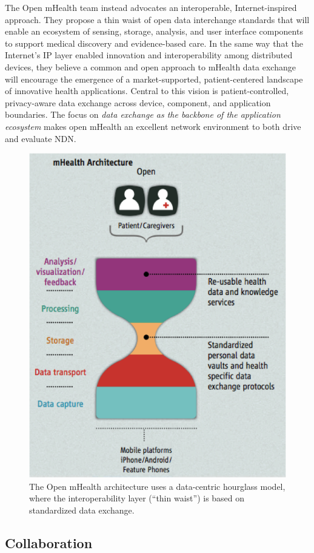 The Open mHealth team instead advocates an interoperable,  Internet-inspired
approach. They propose a thin waist of open data interchange standards
that will enable an ecosystem of sensing, storage, analysis, and user
interface components to support medical
discovery and evidence-based care.  In the same way that the Internet's
IP layer enabled innovation and interoperability among distributed
devices, they believe a common and open approach to mHealth data exchange
will  encourage the emergence of a market-supported, patient-centered
landscape of innovative health applications. Central to this vision is
patient-controlled, privacy-aware data exchange across device, component,
and application boundaries.  The focus on \emph{data exchange as the
backbone of the application ecosystem} makes open mHealth an excellent
network environment to both drive and evaluate NDN.

\begin{figure}
\includegraphics[width=.5\textwidth]{figures/mHealth-hourglass}
\vskip -5pt
\caption{The Open mHealth architecture uses a data-centric hourglass model, where the interoperability layer (``thin waist'') is based on standardized data exchange.~\cite{SimEstrin2010}}
\vskip 6pt
\label{fig:mHealth}
\end{figure}


\subsection{Collaboration}

